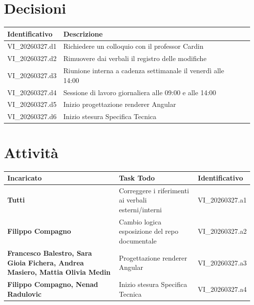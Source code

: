 \documentclass[a4paper,12pt]{article}
\begin{document}
    \section{Decisioni}
        \begin{tabularx}{\textwidth}{|l|X|l|}
            \hline
            \textbf{Identificativo} & \textbf{Descrizione}\\
            \hline
            VI\_20260327.d1 & Richiedere un colloquio con il professor Cardin \\
            \hline
            VI\_20260327.d2 & Rimuovere dai verbali il registro delle modifiche  \\
            \hline
            VI\_20260327.d3 & Riunione interna a cadenza settimanale il venerdì alle 14:00\\
            \hline
            VI\_20260327.d4 & Sessione di lavoro giornaliera alle 09:00 e alle 14:00 \\
            \hline
            VI\_20260327.d5 & Inizio progettazione renderer Angular\\
            \hline
            VI\_20260327.d6 & Inizio stesura Specifica Tecnica\\
            \hline
        \end{tabularx}

    \section{Attività}
        \begin{tabularx}{\textwidth}{|>{\raggedright\arraybackslash}p{4cm}|X|l|}
            \hline
            \textbf{Incaricato} & \textbf{Task Todo} & \textbf{Identificativo} \\
            \hline
            \textbf{Tutti} & Correggere i riferimenti ai verbali esterni/interni & VI\_20260327.a1 \\
            \hline
            \textbf{Filippo Compagno} & Cambio logica esposizione del repo documentale & VI\_20260327.a2 \\
            \hline
            \textbf{Francesco Balestro, Sara Gioia Fichera, Andrea Masiero, Mattia Olivia Medin} & Progettazione renderer Angular& VI\_20260327.a3 \\
            \hline
            \textbf{Filippo Compagno, Nenad Radulovic} & Inizio stesura Specifica Tecnica & VI\_20260327.a4 \\
            \hline
        \end{tabularx}
\end{document}
